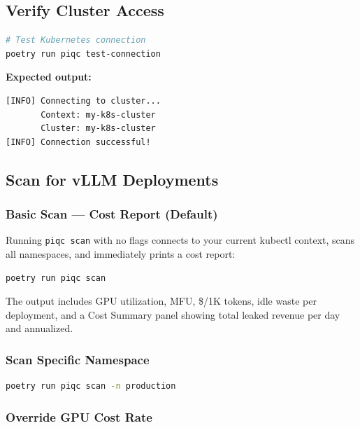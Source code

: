 \documentclass[11pt,a4paper]{article}
\begin{document}
\subsection{Verify Cluster Access}

\begin{lstlisting}[language=bash]
# Test Kubernetes connection
poetry run piqc test-connection
\end{lstlisting}

\textbf{Expected output:}
\begin{lstlisting}
[INFO] Connecting to cluster...
       Context: my-k8s-cluster
       Cluster: my-k8s-cluster
[INFO] Connection successful!
\end{lstlisting}

\subsection{Scan for vLLM Deployments}

\subsubsection{Basic Scan — Cost Report (Default)}

Running \texttt{piqc scan} with no flags connects to your current kubectl context, scans all namespaces, and immediately prints a cost report:

\begin{lstlisting}[language=bash]
poetry run piqc scan
\end{lstlisting}

The output includes GPU utilization, MFU, \$/1K tokens, idle waste per deployment, and a Cost Summary panel showing total leaked revenue per day and annualized.

\subsubsection{Scan Specific Namespace}

\begin{lstlisting}[language=bash]
poetry run piqc scan -n production
\end{lstlisting}

\subsubsection{Override GPU Cost Rate}
\end{document}
